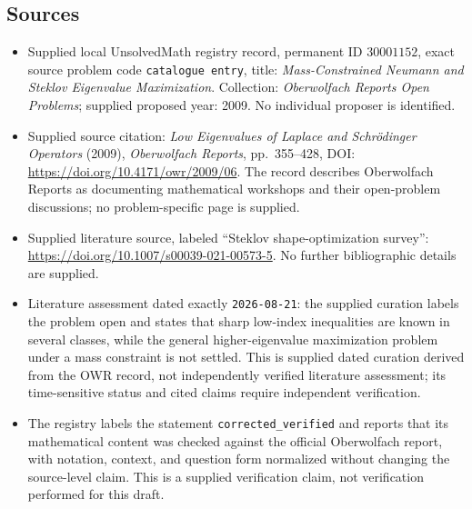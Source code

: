 \documentclass[11pt]{article}
\begin{document}
\subsection{Sources}
\begin{itemize}
\item Supplied local UnsolvedMath registry record, permanent ID \(30001152\), exact source problem code \texttt{catalogue entry}, title: \emph{Mass-Constrained Neumann and Steklov Eigenvalue Maximization}. Collection: \emph{Oberwolfach Reports Open Problems}; supplied proposed year: 2009. No individual proposer is identified.
\item Supplied source citation: \emph{Low Eigenvalues of Laplace and Schrödinger Operators} (2009), \emph{Oberwolfach Reports}, pp.\ 355--428, DOI: \url{https://doi.org/10.4171/owr/2009/06}. The record describes Oberwolfach Reports as documenting mathematical workshops and their open-problem discussions; no problem-specific page is supplied.
\item Supplied literature source, labeled ``Steklov shape-optimization survey'': \url{https://doi.org/10.1007/s00039-021-00573-5}. No further bibliographic details are supplied.
\item Literature assessment dated exactly \texttt{2026-08-21}: the supplied curation labels the problem open and states that sharp low-index inequalities are known in several classes, while the general higher-eigenvalue maximization problem under a mass constraint is not settled. This is supplied dated curation derived from the OWR record, not independently verified literature assessment; its time-sensitive status and cited claims require independent verification.
\item The registry labels the statement \texttt{corrected\_verified} and reports that its mathematical content was checked against the official Oberwolfach report, with notation, context, and question form normalized without changing the source-level claim. This is a supplied verification claim, not verification performed for this draft.
\end{itemize}
\end{document}

